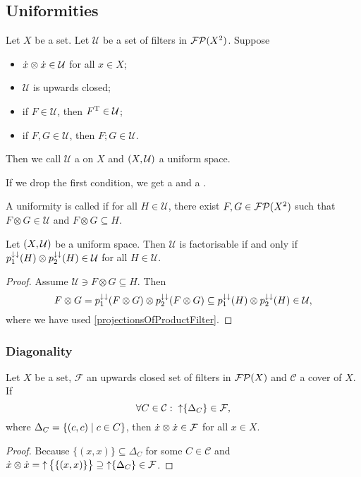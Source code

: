 \subsection{Uniformities}
\begin{definition}
Let $X$ be a set. Let $\mathcal{U}$ be a set of filters in $\operatorname{\mathcal{FP}}(X^2)$. Suppose
\begin{itemize}
\item $\dot{x}\otimes \dot{x} \in \mathcal{U}$ for all $x\in X$;
\item $\mathcal{U}$ is upwards closed;
\item if $F\in \mathcal{U}$, then $F^{\mathrm{T}}\in\mathcal{U}$;
\item if $F, G\in \mathcal{U}$, then $F;G\in\mathcal{U}$.
\end{itemize}
Then we call $\mathcal{U}$ a  on $X$ and $\left( X,\mathcal{U} \right)$ a uniform space.

If we drop the first condition, we get a  and a .

A uniformity is called  if for all $H\in\mathcal{U}$, there exist $F,G\in \operatorname{\mathcal{FP}}(X^2)$ such that $F\otimes G \in\mathcal{U}$ and $F\otimes G\subseteq H$.
\end{definition}

\begin{lemma}
Let $\left( X,\mathcal{U} \right)$ be a uniform space. Then $\mathcal{U}$ is factorisable \textup{if and only if} $p_1^{\downarrow\downarrow}(H)\otimes p_2^{\downarrow\downarrow}(H) \in \mathcal{U}$ for all $H\in\mathcal{U}$.
\end{lemma}
\begin{proof}
Assume $\mathcal{U} \ni F\otimes G \subseteq H$. Then
\[ F\otimes G = p_1^{\downarrow\downarrow}(F\otimes G)\otimes p_2^{\downarrow\downarrow}(F\otimes G) \subseteq p_1^{\downarrow\downarrow}(H)\otimes p_2^{\downarrow\downarrow}(H) \in \mathcal{U}, \]
where we have used \ref{projectionsOfProductFilter}.
\end{proof}

\subsubsection{Diagonality}
\begin{lemma}
Let $X$ be a set, $\mathcal{F}$ an upwards closed set of filters in $\operatorname{\mathcal{FP}}(X)$ and $\mathcal{C}$ a cover of $X$. If
\[ \forall C\in\mathcal{C}: \; \operatorname{\uparrow}\{\Delta_C\} \in \mathcal{F}, \]
where $\Delta_C = \left\{ (c,c) \;\middle|\; c\in C \right\}$, then $\dot{x}\otimes\dot{x}\in\mathcal{F}$ for all $x\in X$.
\end{lemma}
\begin{proof}
Because $\{(x,x)\}\subseteq \Delta_C$ for some $C\in\mathcal{C}$ and $\dot{x}\otimes\dot{x} = \operatorname{\uparrow} \big\{\{(x,x)\}\big\} \supseteq \operatorname{\uparrow}\{\Delta_C\} \in\mathcal{F}$.
\end{proof}

